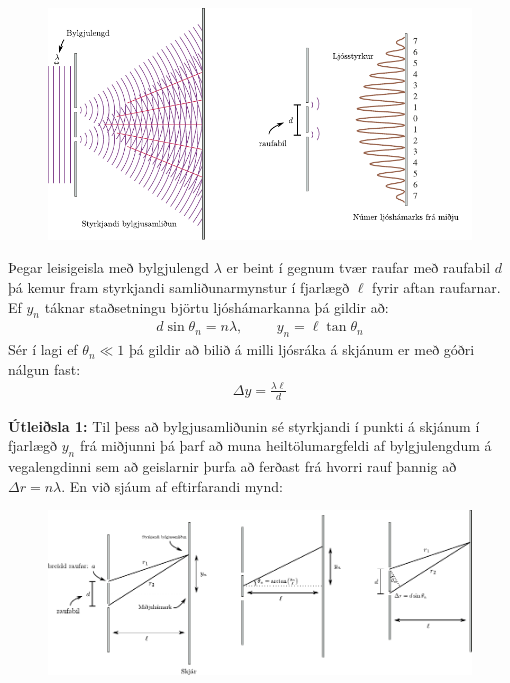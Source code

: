 \begin{figure}[H]
    \centering
    \includegraphics[scale = 0.9]{figures/young-double.pdf}
\end{figure}


\begin{tcolorbox}
\begin{theorem}
Þegar leisigeisla með bylgjulengd $\lambda$ er beint í gegnum tvær raufar með raufabil $d$ þá kemur fram styrkjandi samliðunarmynstur í fjarlægð $\ell$ fyrir aftan raufarnar. Ef $y_n$ táknar staðsetningu björtu ljóshámarkanna þá gildir að:
\begin{align*}
    d\sin\theta_n = n\lambda, \hspace{1cm} y_n = \ell \tan\theta_n
\end{align*}
Sér í lagi ef $\theta_n \ll 1$ þá gildir að bilið á milli ljósráka á skjánum er með góðri nálgun fast:
\begin{align*}
    \Delta y = \frac{\lambda \ell}{d}
\end{align*}
\end{theorem}
\end{tcolorbox}

\textbf{Útleiðsla 1:} Til þess að bylgjusamliðunin sé styrkjandi í punkti á skjánum í fjarlægð $y_n$ frá miðjunni þá þarf að muna heiltölumargfeldi af bylgjulengdum á vegalengdinni sem að geislarnir þurfa að ferðast frá hvorri rauf þannig að $\Delta r = n\lambda$. En við sjáum af eftirfarandi mynd:

\begin{figure}[H]
    \centering
    \includegraphics{figures/young-diagram.pdf}
\end{figure}

